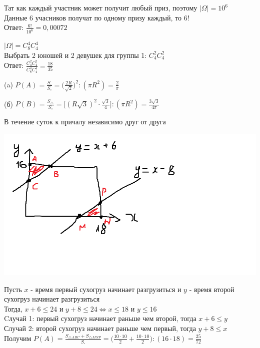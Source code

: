 \begin{exercise}[12]
	Тат как каждый участник может получит любый приз, поэтому $| \Omega | = 10^6$ \\ Данные 6 учасников получат по одному призу каждый, то $6!$ \\ Ответ: $\frac{6!}{10^6} = 0,00072$
\end{exercise}

\begin{exercise}[13]
	$| \Omega | = C^4_8 C^4_4$ \\ Выбрать 2 юношей и 2 девушек для группы 1: $C^2_4 C^2_4$ \\ Ответ: $\frac{C^2_4 C^2_4}{C^4_8 C^4_4} = \frac{18}{35}$
\end{exercise}

\begin{exercise}[14]
	\item [(a)] $P(A) = \frac{S_{\square}}{S_{\circ}} = \Big(\frac{2R}{\sqrt{2}}\Big)^2:(\pi R^2) = \frac{2}{\pi}$
	\item [(б)] $P(B) = \frac{S_{\triangle}}{S_{\circ}} = \Big[(R \sqrt{3})^2 \cdot \frac{\sqrt{3}}{4}\Big] : (\pi R^2) = \frac{3 \sqrt{3}}{4 \pi}$
\end{exercise}

\begin{exercise}[15] В течение суток к причалу независимо друг от друга
	
	\includegraphics[scale=0.5]{exer15.png}
	
	Пусть $x$ - время первый сухогруз начинает разгрузиться и $y$ - время второй сухогруз начинает разгрузиться \\ Тогда, $x+6 \leq 24$ и $y+8 \leq 24 \Leftrightarrow x \leq 18$ и $y \leq 16$ \\ Cлучай 1: первый сухогруз начинает раньше чем второй, тогда $x+6 \leq y$ \\ Случай 2: второй сухогруз начинает раньше чем первый, тогда $y+8 \leq x$ \\ Получим $P(A) = \frac{S_{\triangle ABC} + S_{\triangle MNP}}{S_{\square}} = \Big(\frac{10 \cdot 10}{2} + \frac{10 \cdot 10}{2} \Big) : (16 \cdot 18) = \frac{25}{72}$ 
\end{exercise}
